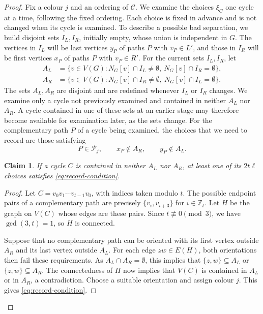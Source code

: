 \documentclass[11pt,a4paper]{article}
\newtheorem{claim}{Claim}
\theoremstyle{remark}
\numberwithin{equation}{section}
\newcommand{\calP}{\mathcal{P}}
\newcommand{\calC}{\mathcal{C}}
\begin{document}
\begin{proof}
		Fix a colour $j$ and an ordering of $\calC$.
		We examine the choices $\xi_C$ one cycle at a time, following the fixed ordering. Each choice is fixed in advance and is not changed when its cycle is examined.
		To describe a possible bad separation, we build disjoint sets $I_L,I_R$, initially
		empty, whose union is independent in $G$.
		The vertices in $I_L$ will be last vertices $y_P$ of paths $P$ with
		$v_P\in L'$, and those in $I_R$ will be first vertices $x_P$ of paths $P$
		with $v_P\in R'$.
		For the current sets $I_L,I_R$, let
		\[
		\begin{split}
			A_L&=\{v\in V(G):N_G[v]\cap I_L\ne\emptyset,\ N_G[v]\cap I_R=\emptyset\},\\
			A_R&=\{v\in V(G):N_G[v]\cap I_R\ne\emptyset,\ N_G[v]\cap I_L=\emptyset\}.
		\end{split}
		\]
		The sets $A_L,A_R$ are disjoint and are redefined whenever $I_L$ or $I_R$ changes.
		We examine only a cycle not previously examined and contained in neither $A_L$
		nor $A_R$. A cycle contained in one of these sets at an earlier stage may
		therefore become available for examination later, as the sets change.
		For the complementary path $P$ of a cycle being examined, the choices that
		we need to record are those satisfying
		\begin{equation}\label{eq:record-condition}
			P\in\calP_j,\qquad x_P\notin A_R,\qquad y_P\notin A_L.
		\end{equation}
		\begin{claim}\label{cl:effective}
			If a cycle $C$ is contained in neither $A_L$ nor $A_R$, at least one of its
			$2t\ell$ choices satisfies \eqref{eq:record-condition}.
		\end{claim}
		
		\begin{proof}
			Let $C=v_0v_1\cdots v_{t-1}v_0$, with indices taken modulo $t$.
			The possible endpoint pairs of a complementary path are precisely
			$\{v_i,v_{i+3}\}$ for $i\in\mathbb Z_t$.
			Let $H$ be the graph on $V(C)$ whose edges are these pairs.
			Since $t\not\equiv0\pmod{3}$, we have $\gcd(3,t)=1$, so $H$ is connected.
			
			Suppose that no complementary path can be oriented with its first
			vertex outside $A_R$ and its last vertex outside $A_L$.
			For each edge $zw\in E(H)$, both orientations then fail these
			requirements. As $A_L\cap A_R=\emptyset$, this implies that
			$\{z,w\}\subseteq A_L$ or $\{z,w\}\subseteq A_R$.
			The connectedness of $H$ now implies that $V(C)$ is contained
			in $A_L$ or in $A_R$, a contradiction.
			Choose a suitable orientation and assign colour $j$.
			This gives \eqref{eq:record-condition}.
		\end{proof}
		

\end{proof}
\end{document}
